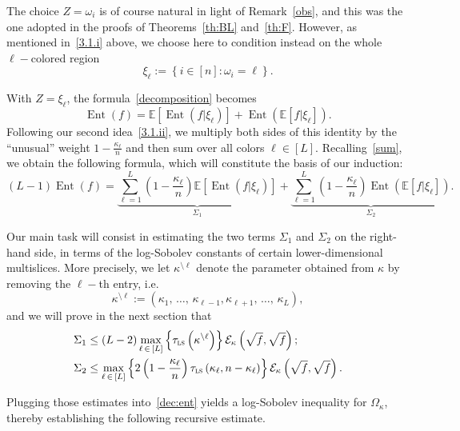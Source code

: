 \documentclass[AHL,Unicode,longabstracts,published]{cedram}
\newcommand{\EE}{\mathbb{E}}
\newcommand{\cE}{\mathcal{E}}
\newcommand{\tls}{\tau_{\textsc{ls}}}
\DeclareMathOperator{\ent}{Ent}
\begin{document}
The choice $Z=\omega_i$ is of course natural in light of Remark~\ref{obs}, and this was the one adopted in the proofs of Theorems~\ref{th:BL} and~\ref{th:F}. However, as mentioned in~\eqref{3.1.i} above, we choose here to condition instead on the whole $\ell-$colored region
\begin{equation}\label{def:xio}
\xi_\ell := \left\{i\in[n]\colon \omega_i=\ell\right\}.
\end{equation}

With $Z=\xi_\ell$, the formula~\eqref{decomposition} becomes
\begin{equation}\label{dec:set}
\ent(f) = \EE\left[\ent\left(f|\xi_\ell\right)\right]+\ent\left(\EE\left[f|\xi_\ell\right]\right).
\end{equation}
Following our second idea~\eqref{3.1.ii}, we multiply both sides of this identity by the ``unusual'' weight $1-\frac{\kappa_\ell}{n}$ and then sum over all colors $\ell\in[L]$. Recalling~\eqref{sum}, we obtain the following formula, which will constitute the basis of our induction:
\begin{equation}\label{dec:ent}
(L-1)\ent(f) = \underbrace{\sum_{\ell=1}^L\left(1-\frac{\kappa_\ell}{n}\right)\EE\left[\ent\left(f|\xi_\ell\right)\right]}_{\Sigma_1}+\underbrace{\sum_{\ell=1}^L\left(1-\frac{\kappa_\ell}{n}\right)\ent\left(\EE\left[f|\xi_\ell\right]\right)}_{\Sigma_2}.
\end{equation}

Our main task will consist in estimating the two terms $\Sigma_1$ and $\Sigma_2$ on the right-hand side, in terms of the log-Sobolev constants of certain lower-dimensional multislices. More precisely, we let $\kappa^{\setminus \ell}$ denote the parameter obtained from $\kappa$ by removing the $\ell-$th entry, i.e.
\[
\kappa^{\setminus\ell} := \left(\kappa_1,\,\ldots,\,\kappa_{\ell-1},\kappa_{\ell+1},\,\ldots,\,\kappa_L\right),
\]
and we will prove in the next section that
\begin{align}
\Sigma_1 & \le (L-2)\max_{\ell\,\in\,[L]}\left\{\tls\left(\kappa^{\setminus\ell}\right)\right\}\cE_\kappa\left(\sqrt{f},\sqrt{f}\right);\label{pr:first}\\
\Sigma_2 & \le \max_{\ell\,\in\,[L]}\left\{2\left(1-\frac{\kappa_\ell}n\right)\tls\left(\kappa_\ell,n-\kappa_\ell\right)\right\}\cE_\kappa\left(\sqrt{f},\sqrt{f}\right).\label{pr:second}
\end{align}

Plugging those estimates into~\eqref{dec:ent} yields a log-Sobolev inequality for $\Omega_\kappa$, thereby establishing the following recursive estimate.
\end{document}
